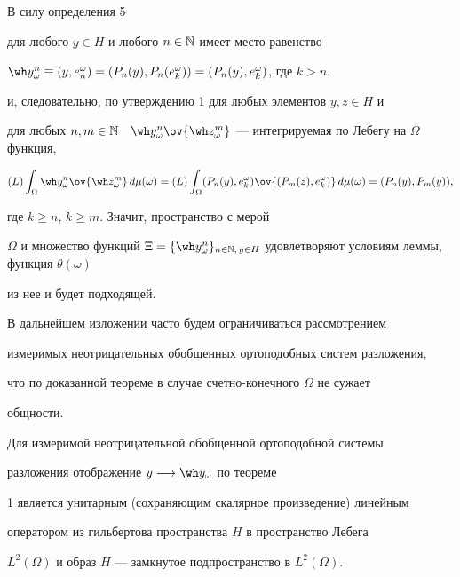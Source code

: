 \begin{pf}


В силу определения 5


для любого $y\in H$ и любого $n\in\Bbb N$ имеет место равенство


$\wh y^n_\omega\equiv(y, e_n^\omega)=(P_n(y),


P_n(e_k^\omega))=(P_n(y),e_k^\omega)$, где $k>n$,


и, следовательно, по утверждению 1 для любых элементов $y,z\in H$ и


для любых $n,m\in\Bbb N\quad\wh y^n_\omega\ov{\wh


z^m_\omega}$ --- интегрируемая по Лебегу на $\Omega$ функция,


$$


(L)\int_\Omega \wh y^n_\omega\ov{\wh


z^m_\omega }\,d\mu (\omega )=(L)\int_\Omega (P_n(y),e^\omega_k


)\ov{(P_m(z),e^\omega_k)}\,d\mu(\omega)=(P_n(y),P_m(y)),


$$


где $k\geqslant n$, $k\geqslant m$. Значит, пространство с мерой


$\Omega$ и множество функций $\Xi=\{\wh y_\omega^n\}_{n\in\Bbb


N,\,y\in H}$ удовлетворяют условиям леммы, функция $\theta(\omega)$


из нее и будет подходящей.


\end{pf}





В дальнейшем изложении часто будем ограничиваться рассмотрением


измеримых неотрицательных обобщенных ортоподобных систем разложения,


что по доказанной теореме в случае счетно-конечного $\Omega$ не сужает


общности.





Для измеримой неотрицательной обобщенной ортоподобной системы


разложения отображение $y\longrightarrow\wh y_\omega$ по теореме


1 является унитарным (сохраняющим скалярное произведение) линейным


оператором из гильбертова пространства $H$ в пространство Лебега


$L^2(\Omega)$ и образ $H$ --- замкнутое подпространство в $L^2(\Omega)$.





